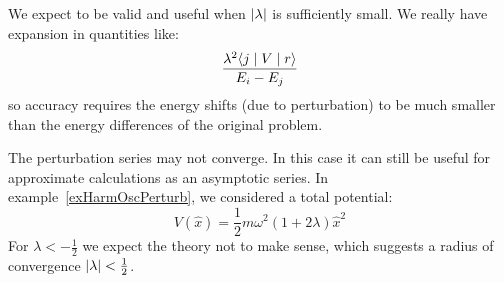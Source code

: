 \documentclass[../Main.tex]{subfiles}
\begin{document}
\begin{remarks}
    \item We expect  to be valid and useful when $\left|\lambda\right|$ is sufficiently small. We really have expansion in quantities like:
        \begin{equation*}
            \frac{\lambda^2 \langle j\mid V\mid r\rangle}{E_i - E_j}
        \end{equation*}
        so accuracy requires the energy shifts (due to perturbation) to be much smaller than the energy differences of the original problem.
    \item The perturbation series may not converge. In this case it can still be useful for approximate calculations as an asymptotic series. In example~\ref{exHarmOscPerturb}, we considered a total potential:
        \begin{equation*}
            V(\hat{x}) = \frac12 m\omega^2 (1 + 2\lambda) \hat{x}^2
        \end{equation*}
        For $\lambda < -\frac12$ we expect the theory not to make sense, which suggests a radius of convergence $\left|\lambda\right| < \frac12$.
\end{remarks}
\end{document}
